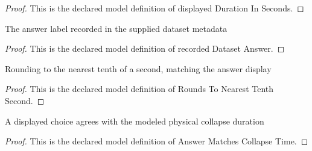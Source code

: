 \begin{proof}
  This is the declared model definition of displayed Duration In Seconds.
\end{proof}
\begin{definition}
  \label{def:physics:phyx-mini-0884:phyxminiproblems-problemphyxmini0884-recordeddatasetanswer}
  The answer label recorded in the supplied dataset metadata
\end{definition}
\begin{proof}
  This is the declared model definition of recorded Dataset Answer.
\end{proof}
\begin{definition}
  \label{def:physics:phyx-mini-0884:phyxminiproblems-problemphyxmini0884-roundstonearesttenthsecond}
  Rounding to the nearest tenth of a second, matching the answer display
\end{definition}
\begin{proof}
  This is the declared model definition of Rounds To Nearest Tenth Second.
\end{proof}
\begin{definition}
  \label{def:physics:phyx-mini-0884:phyxminiproblems-problemphyxmini0884-answermatchescollapsetime}
  A displayed choice agrees with the modeled physical collapse duration
\end{definition}
\begin{proof}
  This is the declared model definition of Answer Matches Collapse Time.
\end{proof}
